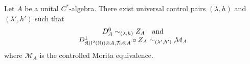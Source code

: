 \begin{prop}
Let $A$ be a unital $C^*$-algebra. There exist universal control pairs $(\lambda,h)$ and $(\lambda',h')$ such that 
\[\begin{array}{c} D^0_A \sim_{(\lambda,h)} Z_A \quad \text{and}\\
D^1_{ \mathfrak K(l^2(\mathbb N)) \otimes A,\mathcal T_0\otimes A}\circ Z_A\sim_{(\lambda',h')} \mathcal M_A \end{array}\]
where $\mathcal M_A$ is the controlled Morita equivalence.
\end{prop}





